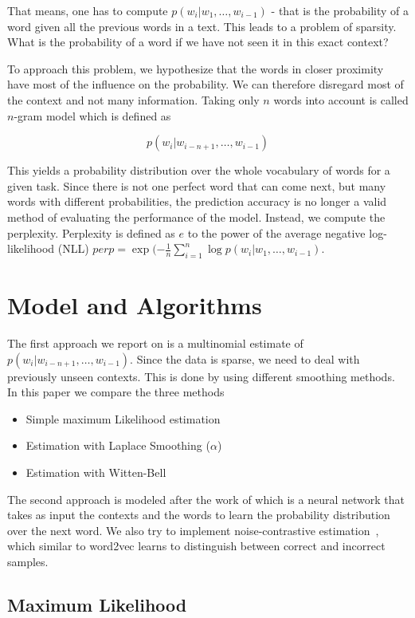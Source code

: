 \documentclass[11pt]{article}
\begin{document}
That means, one has to compute $p(w_i|w_1, \ldots ,w_{i-1})$ - that is the probability of a word given all the previous words in a text. This leads to a problem of sparsity. What is the probability of a word if we have not seen it in this exact context?

To approach this problem, we hypothesize that the words in closer proximity have most of the influence on the probability. We can therefore disregard most of the context and not many information. Taking only $n$ words into account is called $n$-gram model which is defined as 

$$p(w_i|w_{i-n+1}, \ldots, w_{i-1})$$

This yields a probability distribution over the whole vocabulary of words for a given task. Since there is not one perfect word that can come next, but many words with different probabilities, the prediction accuracy is no longer a valid method of evaluating the performance of the model. Instead, we compute the perplexity. Perplexity is defined as $e$ to the power of the average negative log-likelihood (NLL) $perp = \exp(-\frac{1}{n}\sum_{i=1}^{n}\log p(w_i|w_1,\ldots,w_{i-1})$. 



\section{Model and Algorithms}

The first approach we report on is a multinomial estimate of $p(w_i|w_{i-n+1}, \ldots, w_{i-1})$. Since the data is sparse, we need to deal with previously unseen contexts. This is done by using different smoothing methods. In this paper we compare the three methods 
\begin{itemize}
\item Simple maximum Likelihood estimation
\item Estimation with Laplace Smoothing ($\alpha$)
\item Estimation with Witten-Bell
\end{itemize}

The second approach is modeled after the work of \citet{Bengio2003neural} which is a neural network that takes as input the contexts and the words to learn the probability distribution over the next word. We also try to implement noise-contrastive estimation~\citep{gutmann2010noise}, which similar to word2vec learns to distinguish between correct and incorrect samples.

\subsection{Maximum Likelihood}
\end{document}
